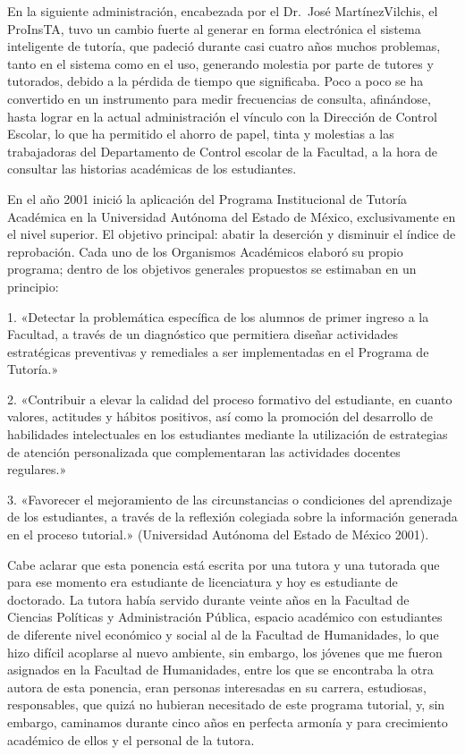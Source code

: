 En la siguiente administración, encabezada por el Dr.~José Martínez\linebreak Vilchis,
el ProInsTA, tuvo un cambio fuerte al generar en forma electrónica el
sistema inteligente de tutoría, que padeció durante casi cuatro años muchos
problemas, tanto en el sistema como en el uso, generando molestia por parte
de tutores y tutorados, debido a la pérdida de tiempo que significaba. Poco a
poco se ha convertido en un instrumento para medir frecuencias de consulta,
afinándose, hasta lograr en la actual administración el vínculo con la
Dirección de Control Escolar, lo que ha permitido el ahorro de papel, tinta
y molestias a las trabajadoras del Departamento de Control escolar de la
Facultad, a la hora de consultar las historias académicas de los estudiantes.


\enlargethispage{1\baselineskip}
En el año 2001 inició la aplicación del Programa Institucional de Tutoría
Académica en la Universidad Autónoma del Estado de México, exclusivamente
en el nivel superior. El objetivo principal: abatir la deserción y
disminuir el índice de reprobación. Cada uno de los Organismos Académicos
elaboró su propio programa; dentro de los objetivos generales propuestos se
estimaban en un principio:

\begin{Obs}
\item[1.] «Detectar la problemática específica de los alumnos de primer ingreso a la
Facultad, a través de un diagnóstico que permitiera diseñar actividades
estratégicas preventivas y remediales a ser implementadas en el Programa de
Tutoría.»
\item[2.] «Contribuir a elevar la calidad del proceso formativo del estudiante, en
cuanto valores, actitudes y hábitos positivos, así como la promoción del
desarrollo de habilidades intelectuales en los estudiantes mediante la
utilización de estrategias de atención personalizada que complementaran las
actividades docentes regulares.»
\item[3.] «Favorecer el mejoramiento de las circunstancias o condiciones del
aprendizaje de los estudiantes, a través de la reflexión colegiada sobre la
información generada en el proceso tutorial.» (Universidad Autónoma del Estado de
México 2001).
\end{Obs}

Cabe aclarar que esta ponencia está escrita por una tutora y una tutorada
que para ese momento era estudiante de licenciatura y hoy es estudiante de
doctorado. La tutora había servido durante veinte años en la Facultad de
Ciencias Políticas y Administración Pública, espacio académico con
estudiantes de diferente nivel económico y social al de la Facultad de
Humanidades, lo que hizo difícil acoplarse al nuevo ambiente, sin embargo,
los jóvenes que me fueron asignados en la Facultad de Humanidades, entre los
que se encontraba la otra autora de esta ponencia, eran personas
interesadas en su carrera, estudiosas, responsables, que quizá no hubieran
necesitado de este programa tutorial, y, sin embargo, caminamos durante cinco
años en perfecta armonía y para crecimiento académico de ellos y el personal
de la tutora.


